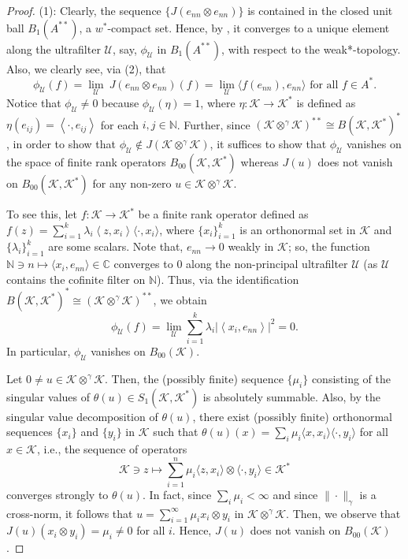 \documentclass[a4]{amsart}
\theoremstyle{cupthm}
\theoremstyle{cupdefn}
\theoremstyle{cuprem}
\numberwithin{equation}{section}
\newcommand{\ot}{\otimes}
\newcommand{\obp}{\otimes^{\gamma}}
\newcommand{\N}{\mathbb N}
\newcommand{\C}{\mathbb C}
\newcommand{\mK}{\mathcal{K}}
\newcommand{\mU}{\mathcal{U}}
\def\la{\langle}
\def\ra{\rangle}
\begin{document}
\begin{proof}
  (1): Clearly, the sequence $\{J(e_{nn} \ot e_{nn})\}$ is contained
  in the closed unit ball $B_1(A^{**})$, a $w^*$-compact set. Hence,
  by , it converges to a unique element along
  the ultrafilter $\mathcal{U}$, say, $\phi_{\mathcal{U}}$ in
  $B_1(A^{**})$, with respect to the weak*-topology. Also, we clearly
  see, via (2), that
  \[
\phi_{\mathcal U}(f) = \lim_{\mU}\ J(e_{nn}\ot e_{nn})(f)=
\lim_{\mU}\la f(e_{nn}), e_{nn}\ra \text{ for all } f \in A^*.
\]
Notice that $\phi_{\mathcal U}\neq0$ because $\phi_{\mathcal
  U}(\eta)=1$, where $\eta:\mathcal K\to\mathcal K^*$ is defined as
$\eta(e_{ij})=\left<\cdot,e_{ij}\right>$ for each $i,j\in \mathbb
N$. Further, since $(\mK\obp \mK)^{**}\cong B(\mK,\mK^*)^*$, in order
to show that $\phi_{\mathcal U}\notin J({\mathcal K\obp\mathcal K})$,
it suffices to show that $\phi_{\mathcal U}$ vanishes on the space of
finite rank operators $B_{00}(\mK,\mK^*)$ whereas $J(u)$ does not
vanish on $B_{00}(\mK,\mK^*)$ for any non-zero $u \in\mK \obp \mK$.

To see this, let $f:\mK\to\mK^*$ be a finite rank operator defined as
$f(z) =\sum_{i=1}^k \lambda_i\left<z ,x_i\right>\la\cdot, x_i\ra$,
where $\{x_i\}_{i=1}^k$ is an orthonormal set in $\mathcal K$ and
$\{\lambda_i\}_{i=1}^k$ are some scalars. Note that, $e_{nn} \to
0$ weakly in $\mK$; so, the function $\N \ni n \mapsto \la x_i, e_{nn}
\ra \in \C$ converges to $0$ along the non-principal ultrafilter $\mU$
(as $\mU$ contains the cofinite filter on $\N$).  Thus, via the
identification $B(\mK,\mK^*)^* \cong (\mK \obp \mK)^{**}$, we obtain
\[
\phi_{\mathcal U}(f)  = \lim_{\mathcal
  U}\sum_{i=1}^k\lambda_i|\left<x_i,e_{nn}\right>|^2=0.
\]
In particular,  $\phi_\mU$ vanishes on $B_{00}(\mK)$.

Let $0\neq u \in \mK \obp \mK$. Then, the (possibly finite) sequence
$\{\mu_i\}$ consisting of the singular values of $\theta(u) \in
S_1(\mK,\mK^*)$ is absolutely summable. Also, by the singular value
decomposition of $\theta(u)$, there exist (possibly finite) orthonormal sequences
$\{x_i\}$ and $\{y_i\}$ in $\mK$ such that $\theta(u)(x)= \sum_i \mu_i
\la x , x_i\ra \la\cdot,y_i\ra$ for all $x \in \mK$, i.e., the
sequence of operators
\[
\mathcal{K} \ni z\mapsto \sum_{i=1}^n \mu_i\la z, x_i\ra \otimes
\la\cdot,y_i\ra \in \mathcal{K}^*
\]
converges strongly to $\theta(u)$. In fact, since $\sum_i \mu_i
< \infty$ and since $\|\cdot \|_\gamma$ is a cross-norm, it follows
that $u = \sum_{i=1}^{\infty} \mu_i x_i \otimes y_i$ in $\mK \obp
\mK$. Then, we observe that $J(u)(x_i \otimes y_i) = \mu_i \neq 0$ for
all $i$. Hence, $J(u)$ does not vanish on $B_{00}(\mK)$.
\smallskip





\end{proof}
\end{document}
